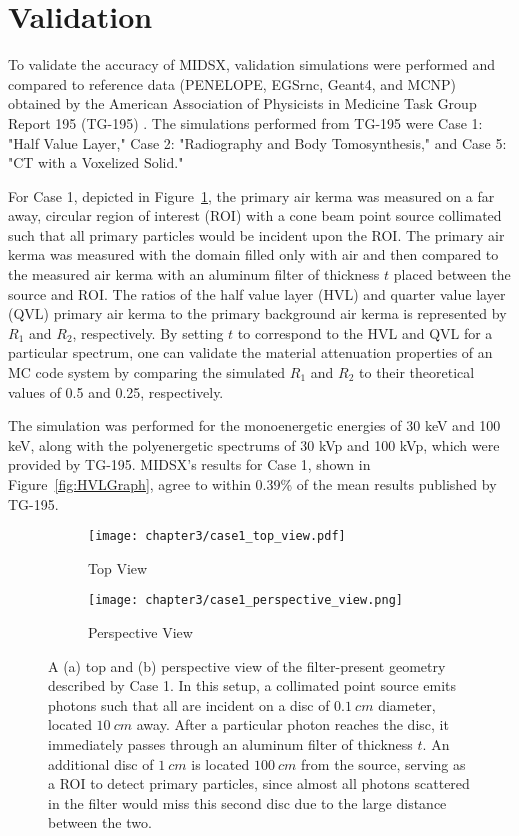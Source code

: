 \section{Validation}
\par To validate the accuracy of MIDSX, validation simulations were performed and compared to reference data (PENELOPE, EGSrnc, Geant4, and MCNP) obtained by the American Association of Physicists in Medicine Task Group Report 195 (TG-195) \cite{sechopoulos_monte_2015}. The simulations performed from TG-195 were Case 1: "Half Value Layer," Case 2: "Radiography and Body Tomosynthesis," and Case 5: "CT with a Voxelized Solid." 

\par For Case 1, depicted in Figure~\ref{fig:case1}, the primary air kerma was measured on a far away, circular region of interest (ROI) with a cone beam point source collimated such that all primary particles would be incident upon the ROI. The primary air kerma was measured with the domain filled only with air and then compared to the measured air kerma with an aluminum filter of thickness $t$ placed between the source and ROI. The ratios of the half value layer (HVL) and quarter value layer (QVL) primary air kerma to the primary background air kerma is represented by $R_1$ and $R_2$, respectively. By setting $t$ to correspond to the HVL and QVL for a particular spectrum, one can validate the material attenuation properties of an MC code system by comparing the simulated $R_1$ and $R_2$ to their theoretical values of 0.5 and 0.25, respectively. 
\par The simulation was performed for the monoenergetic energies of 30 keV and 100 keV, along with the polyenergetic spectrums of 30 kVp and 100 kVp, which were provided by TG-195. MIDSX's results for Case 1, shown in Figure~\ref{fig:HVLGraph}, agree to within 0.39\% of the mean results published by TG-195.

\begin{figure}[H]
    \centering
    \begin{subfigure}[l]{\textwidth}
        \centering
        \texttt{[image: chapter3/case1\_top\_view.pdf]}
        \caption{Top View}
    \end{subfigure}
    \hfill %
    \begin{subfigure}[l]{\textwidth}
        \centering
        \texttt{[image: chapter3/case1\_perspective\_view.png]}
        \caption{Perspective View}
    \end{subfigure}
    \caption{A (a) top and (b) perspective view of the filter-present geometry described by Case 1. In this setup, a collimated point source emits photons such that all are incident on a disc of $\qty{0.1}{cm}$ diameter, located $\qty{10}{cm}$ away. After a particular photon reaches the disc, it immediately passes through an aluminum filter of thickness $t$. An additional disc of $\qty{1}{cm}$ is located $\qty{100}{cm}$ from the source, serving as a ROI to detect primary particles, since almost all photons scattered in the filter would miss this second disc due to the large distance between the two.}
    \label{fig:case1}
\end{figure}

